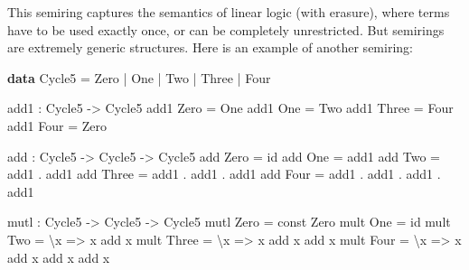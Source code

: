 \documentclass[
]{article}
\newenvironment{Shaded}{}{}
\newcommand{\DataTypeTok}[1]{\textcolor[rgb]{0.56,0.13,0.00}{#1}}
\newcommand{\FunctionTok}[1]{\textcolor[rgb]{0.02,0.16,0.49}{#1}}
\newcommand{\KeywordTok}[1]{\textcolor[rgb]{0.00,0.44,0.13}{\textbf{#1}}}
\newcommand{\NormalTok}[1]{#1}
\newcommand{\OperatorTok}[1]{\textcolor[rgb]{0.40,0.40,0.40}{#1}}
\newcommand{\OtherTok}[1]{\textcolor[rgb]{0.00,0.44,0.13}{#1}}
\begin{document}
This semiring captures the semantics of linear logic (with erasure),
where terms have to be used exactly once, or can be completely
unrestricted. But semirings are extremely generic structures. Here is an
example of another semiring:

\begin{Shaded}
\begin{Highlighting}[]
\KeywordTok{data} \DataTypeTok{Cycle5} \OtherTok{=} \DataTypeTok{Zero} \OperatorTok{|} \DataTypeTok{One} \OperatorTok{|} \DataTypeTok{Two} \OperatorTok{|} \DataTypeTok{Three} \OperatorTok{|} \DataTypeTok{Four}

\NormalTok{add1 }\OperatorTok{:} \DataTypeTok{Cycle5} \OtherTok{{-}\textgreater{}} \DataTypeTok{Cycle5}
\NormalTok{add1 }\DataTypeTok{Zero} \OtherTok{=} \DataTypeTok{One}
\NormalTok{add1 }\DataTypeTok{One} \OtherTok{=} \DataTypeTok{Two}
\NormalTok{add1 }\DataTypeTok{Three} \OtherTok{=} \DataTypeTok{Four}
\NormalTok{add1 }\DataTypeTok{Four} \OtherTok{=} \DataTypeTok{Zero}

\NormalTok{add }\OperatorTok{:} \DataTypeTok{Cycle5} \OtherTok{{-}\textgreater{}} \DataTypeTok{Cycle5} \OtherTok{{-}\textgreater{}} \DataTypeTok{Cycle5}
\NormalTok{add }\DataTypeTok{Zero} \OtherTok{=} \FunctionTok{id}
\NormalTok{add }\DataTypeTok{One} \OtherTok{=}\NormalTok{ add1}
\NormalTok{add }\DataTypeTok{Two} \OtherTok{=}\NormalTok{ add1 }\OperatorTok{.}\NormalTok{ add1}
\NormalTok{add }\DataTypeTok{Three} \OtherTok{=}\NormalTok{ add1 }\OperatorTok{.}\NormalTok{ add1 }\OperatorTok{.}\NormalTok{ add1}
\NormalTok{add }\DataTypeTok{Four} \OtherTok{=}\NormalTok{ add1 }\OperatorTok{.}\NormalTok{ add1 }\OperatorTok{.}\NormalTok{ add1 }\OperatorTok{.}\NormalTok{ add1}

\NormalTok{mutl }\OperatorTok{:} \DataTypeTok{Cycle5} \OtherTok{{-}\textgreater{}} \DataTypeTok{Cycle5} \OtherTok{{-}\textgreater{}} \DataTypeTok{Cycle5}
\NormalTok{mutl }\DataTypeTok{Zero} \OtherTok{=} \FunctionTok{const} \DataTypeTok{Zero}
\NormalTok{mult }\DataTypeTok{One} \OtherTok{=} \FunctionTok{id}
\NormalTok{mult }\DataTypeTok{Two} \OtherTok{=}\NormalTok{ \textbackslash{}x }\OtherTok{=\textgreater{}}\NormalTok{ x }\OtherTok{\textasciigrave{}add\textasciigrave{}}\NormalTok{ x}
\NormalTok{mult }\DataTypeTok{Three} \OtherTok{=}\NormalTok{ \textbackslash{}x }\OtherTok{=\textgreater{}}\NormalTok{ x }\OtherTok{\textasciigrave{}add\textasciigrave{}}\NormalTok{ x }\OtherTok{\textasciigrave{}add\textasciigrave{}}\NormalTok{ x}
\NormalTok{mult }\DataTypeTok{Four} \OtherTok{=}\NormalTok{ \textbackslash{}x }\OtherTok{=\textgreater{}}\NormalTok{ x }\OtherTok{\textasciigrave{}add\textasciigrave{}}\NormalTok{ x }\OtherTok{\textasciigrave{}add\textasciigrave{}}\NormalTok{ x }\OtherTok{\textasciigrave{}add\textasciigrave{}}\NormalTok{ x}
\end{Highlighting}
\end{Shaded}
\end{document}
